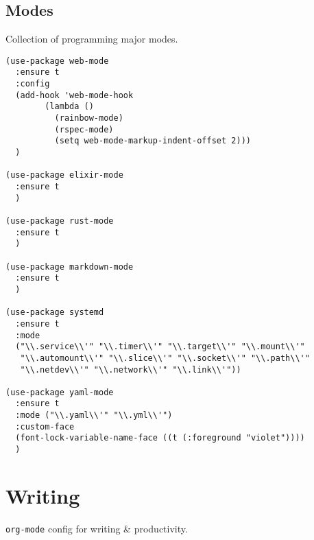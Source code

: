 \documentclass[11pt]{article}
\begin{document}
\subsection{Modes}
\label{sec:orge0629a3}
Collection of programming major modes.
\begin{verbatim}
(use-package web-mode
  :ensure t
  :config
  (add-hook 'web-mode-hook
	    (lambda ()
	      (rainbow-mode)
	      (rspec-mode)
	      (setq web-mode-markup-indent-offset 2)))
  )

(use-package elixir-mode
  :ensure t
  )

(use-package rust-mode
  :ensure t
  )

(use-package markdown-mode
  :ensure t
  )

(use-package systemd
  :ensure t
  :mode
  ("\\.service\\'" "\\.timer\\'" "\\.target\\'" "\\.mount\\'"
   "\\.automount\\'" "\\.slice\\'" "\\.socket\\'" "\\.path\\'"
   "\\.netdev\\'" "\\.network\\'" "\\.link\\'"))

(use-package yaml-mode
  :ensure t
  :mode ("\\.yaml\\'" "\\.yml\\'")
  :custom-face
  (font-lock-variable-name-face ((t (:foreground "violet"))))
  )
\end{verbatim}
\section{Writing}
\label{sec:orga0344a3}
\texttt{org-mode} config for writing \& productivity.
\end{document}
